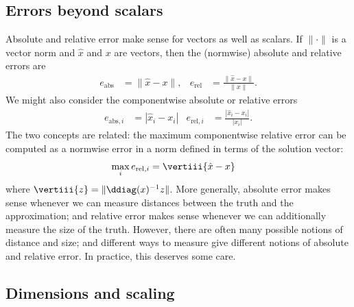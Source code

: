 \subsection{Errors beyond scalars}

Absolute and relative error make sense for vectors as well as scalars.
If $\| \cdot \|$ is a vector
norm and $\hat{x}$ and $x$ are vectors, then the (normwise) absolute
and relative errors are
\begin{align*}
  e_{\mathrm{abs}} &= \|\hat{x}-x\|, &
  e_{\mathrm{rel}} &= \frac{\|\hat{x}-x\|}{\|x\|}.
\end{align*}
We might also consider the componentwise absolute or relative errors
\begin{align*}
  e_{\mathrm{abs},i} &= |\hat{x}_i-x_i| &
  e_{\mathrm{rel},i} &= \frac{|\hat{x}_i-x_i|}{|x_i|}.
\end{align*}
The two concepts are related: the maximum componentwise relative error
can be computed as a normwise error in a norm defined in terms of the
solution vector:
\begin{align*}
  \max_i e_{\mathrm{rel},i} &= \vertiii{\hat{x}-x}
\end{align*}
where $\vertiii{z} = \|\ddiag(x)^{-1} z\|$.
More generally, absolute error makes sense whenever we can measure
distances between the truth and the approximation; and relative error
makes sense whenever we can additionally measure the size of the
truth.  However, there are often many possible notions of distance
and size; and different ways to measure give different notions of
absolute and relative error.  In practice, this deserves some care.

\subsection{Dimensions and scaling}

